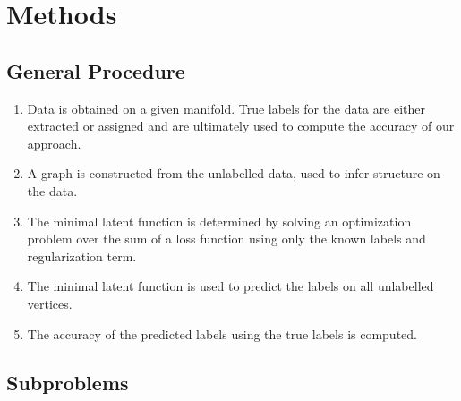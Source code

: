 \documentclass[12pt]{amsart}
\begin{document}

\section{Methods}

\subsection{General Procedure}
\begin{enumerate}
    \item Data is obtained on a given manifold. True labels for the data are either extracted or assigned and are ultimately used to compute the accuracy of our approach.
    \item A graph is constructed from the unlabelled data, used to infer structure on the data. 
    \item The minimal latent function is determined by solving an optimization problem over the sum of a loss function using only the known labels and regularization term.
    \item The minimal latent function is used to predict the labels on all unlabelled vertices.
    \item The accuracy of the predicted labels using the true labels is computed.
\end{enumerate}

\subsection{Subproblems}
\end{document}
